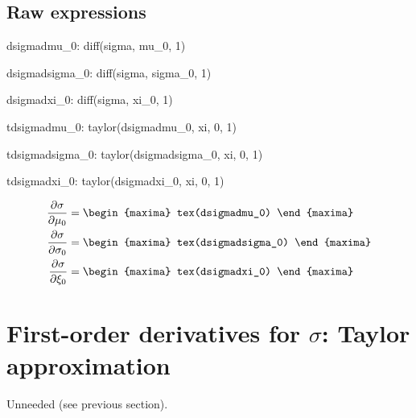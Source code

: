 \subsection*{Raw expressions}

\begin{maxima}
  dsigmadmu_0: diff(sigma, mu_0, 1)
\end{maxima}
\begin{maxima}
  dsigmadsigma_0: diff(sigma, sigma_0, 1)
\end{maxima}
\begin{maxima}
  dsigmadxi_0: diff(sigma, xi_0, 1)
\end{maxima}

\begin{maxima}
  tdsigmadmu_0: taylor(dsigmadmu_0, xi, 0, 1)
\end{maxima}
\begin{maxima}
  tdsigmadsigma_0: taylor(dsigmadsigma_0, xi, 0, 1)
\end{maxima}
\begin{maxima}
  tdsigmadxi_0: taylor(dsigmadxi_0, xi, 0, 1)
\end{maxima}

{\color{MonVertF} 
\begin{align*}
  \frac{\partial{\sigma}}{\partial \mu_0}
  &=
\begin{maxima}
  tex(dsigmadmu_0)
\end{maxima}\\
 \frac{\partial{\sigma}}{\partial \sigma_0}
  &=
\begin{maxima}
  tex(dsigmadsigma_0)
\end{maxima}\\
 \frac{\partial{\sigma}}{\partial \xi_0}
  &=
\begin{maxima}
  tex(dsigmadxi_0)
\end{maxima}
\end{align*}
}

\section{First-order derivatives for $\sigma$:
  Taylor approximation}

Unneeded (see previous section).


